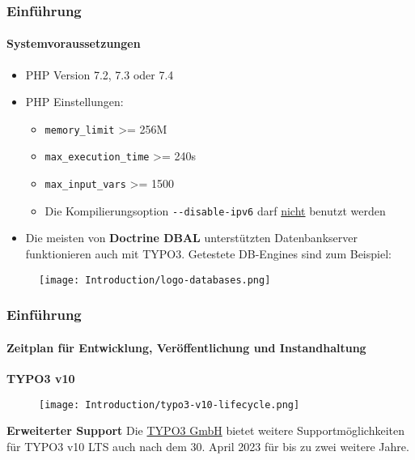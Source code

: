 \begin{frame}[fragile]
	\frametitle{Einführung}
	\framesubtitle{Systemvoraussetzungen}

	\begin{itemize}
		\item PHP Version 7.2, 7.3 oder 7.4
		\item PHP Einstellungen:

			\begin{itemize}
				\item \texttt{memory\_limit} >= 256M
				\item \texttt{max\_execution\_time} >= 240s
				\item \texttt{max\_input\_vars} >= 1500
				\item Die Kompilierungsoption \texttt{-}\texttt{-disable-ipv6} darf \underline{nicht} benutzt werden
			\end{itemize}

		\item Die meisten von \textbf{Doctrine DBAL} unterstützten Datenbankserver funktionieren auch mit TYPO3.
			Getestete DB-Engines sind zum Beispiel:
	\end{itemize}

	\begin{figure}
		\texttt{[image: Introduction/logo-databases.png]}
	\end{figure}

\end{frame}


\begin{frame}[fragile]
	\frametitle{Einführung}
	\framesubtitle{Zeitplan für Entwicklung, Veröffentlichung und Instandhaltung}

	\textbf{TYPO3 v10}

	\begin{figure}
		\texttt{[image: Introduction/typo3-v10-lifecycle.png]}
	\end{figure}

	\textbf{Erweiterter Support}\newline
	\smaller
		Die \href{https://typo3.com}{TYPO3 GmbH} bietet weitere Supportmöglichkeiten
		für TYPO3 v10 LTS auch nach dem 30. April 2023 für bis zu zwei weitere Jahre.
	\normalsize

\end{frame}

